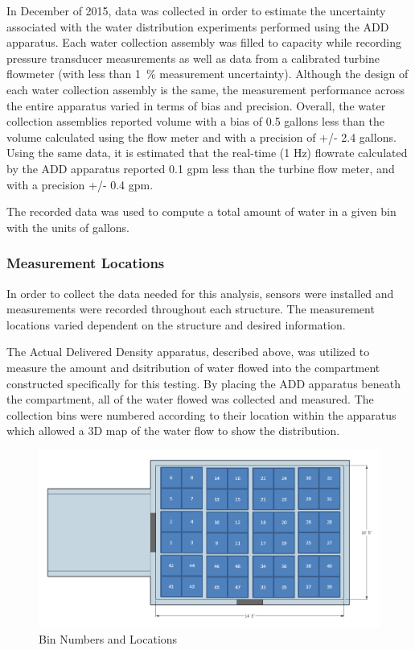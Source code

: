 \documentclass{article}
\begin{document}
In December of 2015, data was collected in order to estimate the uncertainty associated with the water distribution experiments performed using the ADD apparatus. Each water collection assembly was filled to capacity while recording pressure transducer measurements as well as data from a calibrated turbine flowmeter (with less than 1~\% measurement uncertainty).
Although the design of each water collection assembly is the same, the measurement performance across the entire apparatus varied in terms of bias and precision. Overall, the water collection assemblies reported volume with a bias of 0.5 gallons less than the volume calculated using the flow meter and with a precision of +/- 2.4 gallons. Using the same data, it is estimated that the real-time (1 Hz) flowrate calculated by the ADD apparatus reported 0.1 gpm less than the turbine flow meter, and with a precision +/- 0.4 gpm.

The recorded data was used to compute a total amount of water in a given bin with the units of gallons.

\clearpage

\subsubsection{Measurement Locations}

In order to collect the data needed for this analysis, sensors were installed and measurements were recorded throughout each structure. The measurement locations varied dependent on the structure and desired information.

The Actual Delivered Density apparatus, described above, was utilized to measure the amount and dsitribution of water flowed into the compartment constructed specifically for this testing. By placing the ADD apparatus beneath the compartment, all of the water flowed was collected and measured. The collection bins were numbered according to their location within the apparatus which allowed a 3D map of the water flow to show the distribution.

\begin{figure}[!ht]
	\centering
	\includegraphics[width=6in]{Figures/Water_Distribution/Measurement_Locations_BinNumbers.png}
	\caption{Bin Numbers and Locations}
	\label{fig:Bin Numbers and Locations}
\end{figure}
\end{document}
